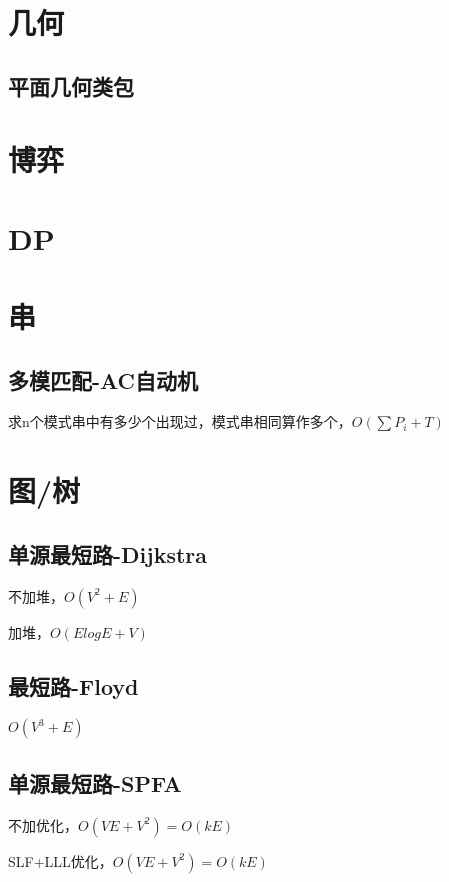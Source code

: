 \documentclass[10pt]{article}
\begin{document}
\section{几何}
\subsection{平面几何类包}

\section{博弈}
\section{DP}
\section{串}
\subsection{多模匹配-AC自动机}
求n个模式串中有多少个出现过，模式串相同算作多个，$O(\sum P_i+T)$

\section{图/树}
\subsection{单源最短路-Dijkstra}
不加堆，$O(V^2+E)$

加堆，$O(ElogE+V)$


\subsection{最短路-Floyd}
$O(V^3+E)$


\subsection{单源最短路-SPFA}
不加优化，$O(VE+V^2)=O(kE)$

SLF+LLL优化，$O(VE+V^2)=O(kE)$

\end{document}
